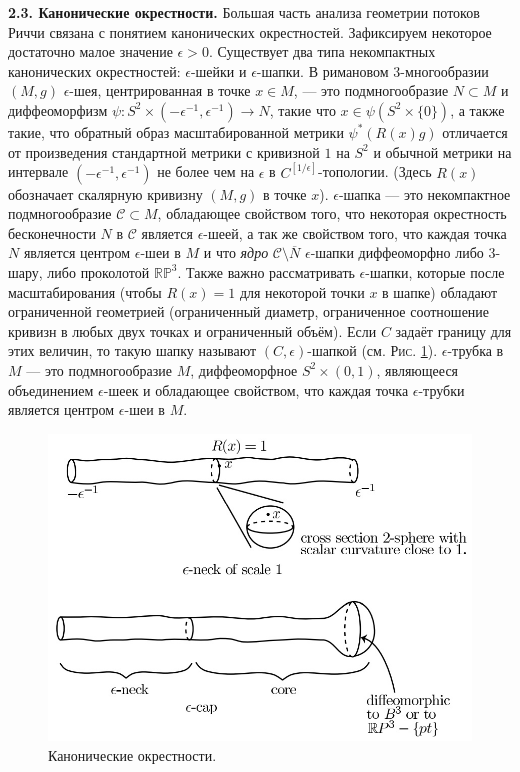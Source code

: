 \textbf{2.3. Канонические окрестности.} Большая часть анализа геометрии потоков Риччи связана 
с понятием канонических окрестностей. Зафиксируем некоторое достаточно малое значение 
$\epsilon > 0$. Существует два типа некомпактных канонических окрестностей: $\epsilon$-шейки и $\epsilon$-шапки.
В римановом 3-многообразии $(M,g)$ $\epsilon$-шея, центрированная в точке $x\in M$, — это подмногообразие 
$N\subset M$ и диффеоморфизм $\psi:S^{2} \times (-{\epsilon}^{-1} ,{\epsilon}^{-1})\rightarrow N$, 
такие что $x\in \psi(S^{2} \times \{0\})$, а также такие, 
что обратный образ масштабированной метрики $\psi^{*} (R(x)g)$ отличается от произведения 
стандартной метрики с кривизной $1$ на $S^{2}$ и обычной метрики на интервале $(-{\epsilon}^{-1} ,{\epsilon}^{-1})$ 
не более чем на $\epsilon$ в $C^{[1/\epsilon]}$-топологии. (Здесь $R(x)$ обозначает скалярную кривизну 
$(M,g)$ в точке $x$).
$\epsilon$-шапка — это некомпактное подмногообразие $\mathcal{C} \subset M$, обладающее свойством того, что 
некоторая окрестность бесконечности $N$ в $\mathcal{C}$ является $\epsilon$-шеей, а так же свойством того, что 
каждая точка $N$ является центром $\epsilon$-шеи в $M$ и что 
\textit{ядро} $\mathcal{C} \setminus \overline{N}$ $\epsilon$-шапки диффеоморфно либо 3-шару, либо проколотой $\mathbb{RP}^3$.
Также важно рассматривать $\epsilon$-шапки, которые после масштабирования 
(чтобы $R(x)=1$ для некоторой точки $x$ в шапке) обладают ограниченной 
геометрией (ограниченный диаметр, ограниченное соотношение кривизн 
в любых двух точках и ограниченный объём). Если $C$ задаёт границу 
для этих величин, то такую шапку называют $(C,\epsilon)$-шапкой (см. \textsc{Рис.} \ref{fig:fig1}).
$\epsilon$-трубка в $M$ — это подмногообразие $M$, диффеоморфное $S^{2}\times (0,1)$, 
являющееся объединением $\epsilon$-шеек и обладающее свойством, что каждая 
точка $\epsilon$-трубки является центром $\epsilon$-шеи в $M$.
\begin{figure}[h]
    \centering
    \includegraphics[width=\textwidth]{chapterIntro/subsection2/1.jpg}
    \caption{Канонические окрестности.}
    \label{fig:fig1}
\end{figure}

